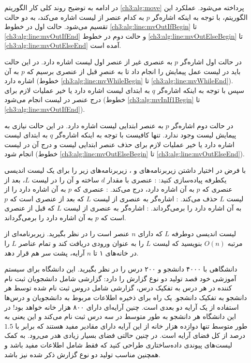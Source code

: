 در ادامه به توضیح روند کلی کار الگوریتم {\eqref{ch3:alg:move}} پرداخته می‌شود. عملکرد این الگوریتم، با توجه به اینکه اشاره‌گر {$p$} به کدام عنصر از لیست {} اشاره می‌کند، به دو حالت تقسیم می‌شود. حالت اول در خطوط {\ref{ch3:alg:line:mvOutIfBegin}} تا {\ref{ch3:alg:line:mvOutIfEnd}} و حالت دوم در خطوط {\ref{ch3:alg:line:mvOutElseBegin}} تا {\ref{ch3:alg:line:mvOutElseEnd}} آمده است.

در حالت اول اشاره‌گر {$p$} به عنصری غیر از عنصر اول لیست {} اشاره دارد. در این حالت باید در لیست {} عمل پیمایش را انجام داد تا به عنصرِ قبل از عنصری برسیم که {$p$} به آن اشاره دارد (خطوط {\ref{ch3:alg:line:mvWhileBegin}} تا {\ref{ch3:alg:line:mvWhileEnd}}). سپس با توجه به اینکه اشاره‌گر {$q$} به ابتدای لیست {} اشاره دارد یا خیر عملیات لازم برای درج عنصر در لیست {} انجام می‌شود (خطوط {\ref{ch3:alg:mvInIf1Begin}} تا {\ref{ch3:alg:line:mvOutIfEnd}}).

در حالت دوم اشاره‌گر {$p$} به عنصر ابتدایی لیست {} اشاره دارد. در این حالت نیازی به پیمایش لیست {} وجود ندارد. تنها کافیست با توجه به اینکه اشاره‌گر {$q$} به ابتدای لیست {} اشاره دارد یا خیر عملیات لازم برای حذف عنصر ابتدایی لیست {} و درج آن در لیست {} انجام شود (خطوط {\ref{ch3:alg:line:mvOutElseBegin}} تا {\ref{ch3:alg:line:mvOutElseEnd}}).

 با فرض در اختیار داشتن زیربرنامه‌های {} و {}، زیربرنامه‌های زیر را برای یک لیست اندیسی یکطرفه پیاده‌سازی کنید:
: عنصری با مقدار {$d$} ساخته و آن را در لیست {$L$}، بعد از عنصری که {$p$} به آن اشاره دارد، درج می‌کند.
: عنصری که {$p$} به آن اشاره دارد را از لیست {$L$} حذف می‌کند.
: اشاره‌گر به عنصری از لیست {$L$} که بعد از عنصری است که {$p$} به آن اشاره دارد را برمی‌گرداند.
: اشاره‌گر به عنصری از لیست {$L$} که قبل از عنصری است که {$p$} به آن اشاره دارد را برمی‌گرداند.


 لیست اندیسی دوطرفه {$L$} که دارای {$n$} عنصر است را در نظر بگیرید. زیربرنامه‌ای از مرتبه {$O(n)$} بنویسید که لیست {$L$} را به عنوان ورودی دریافت کند و تمام عناصر {$L$} را در خانه‌های ۱ تا {$n$} آرایه، پشت سر هم قرار دهد.


 دانشگاهی با ۴۰۰۰ دانشجو و ۲۰۰ درس را در نظر بگیرید. این دانشگاه برای سیستم آموزشی خود قصد تولید دو نوع گزارش را دارد:
 گزارشی شامل دانشجویان ثبت نام کننده در هر درس به تفکیک درس،
 گزارشی شامل دروس ثبت نام شده توسط هر دانشجو به تفکیک دانشجو.
یک راه برای ذخیره اطلاعات مربوط به دانشجویان و درس‌ها استفاده از یک آرایه دو بعدی است. چنین آرایه‌ای دارای ۸۰۰ هزار خانه خواهد بود! در این دانشگاه هر دانشجو به طور متوسط در سه درس ثبت نام می‌کند و این یعنی به طور متوسط تنها دوازده هزار خانه از این آرایه دارای مقادیر مفید هستند که برابر با {$1.5$} درصد از کل فضای آرایه است. در چنین حالتی فضای بسیار زیادی هدر می‌رود. به کمک لیست‌های پیوندی داده‌ساختاری طراحی کنید که فقط شامل اطلاعات مفید باشد و همچنین مناسب تولید دو نوع گزارش ذکر شده نیز باشد.

